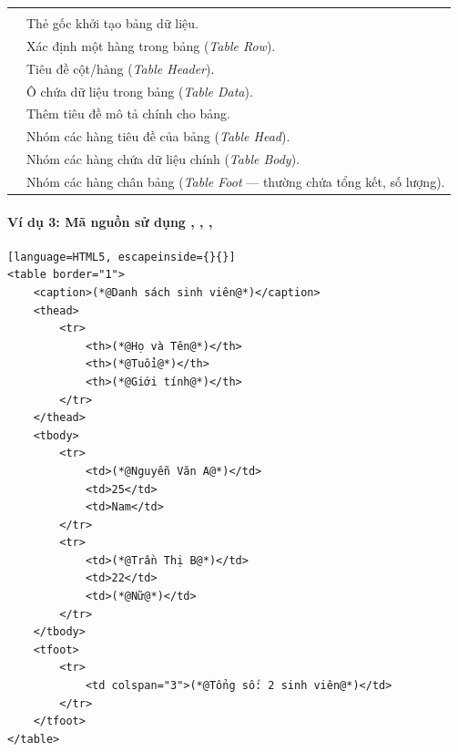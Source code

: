 \begin{prettyTableBox}
\begin{tabularx}{\linewidth}{K{2.5cm} Z}
 &  \\
 & Thẻ gốc khởi tạo bảng dữ liệu. \\
 & Xác định một hàng trong bảng (\textit{Table Row}). \\
 & Tiêu đề cột/hàng (\textit{Table Header}). \\
 & Ô chứa dữ liệu trong bảng (\textit{Table Data}). \\
 & Thêm tiêu đề mô tả chính cho bảng. \\
 & Nhóm các hàng tiêu đề của bảng (\textit{Table Head}). \\
 & Nhóm các hàng chứa dữ liệu chính (\textit{Table Body}). \\
 & Nhóm các hàng chân bảng (\textit{Table Foot} --- thường chứa tổng kết, số lượng). \\
\end{tabularx}
\end{prettyTableBox}

\paragraph{Ví dụ 3: Mã nguồn sử dụng , , , }
\begin{codeWindow}
\begin{lstlisting}[language=HTML5, escapeinside={}{}]
<table border="1">
    <caption>(*@Danh sách sinh viên@*)</caption>
    <thead>
        <tr>
            <th>(*@Họ và Tên@*)</th>
            <th>(*@Tuổi@*)</th>
            <th>(*@Giới tính@*)</th>
        </tr>
    </thead>
    <tbody>
        <tr>
            <td>(*@Nguyễn Văn A@*)</td>
            <td>25</td>
            <td>Nam</td>
        </tr>
        <tr>
            <td>(*@Trần Thị B@*)</td>
            <td>22</td>
            <td>(*@Nữ@*)</td>
        </tr>
    </tbody>
    <tfoot>
        <tr>
            <td colspan="3">(*@Tổng số: 2 sinh viên@*)</td>
        </tr>
    </tfoot>
</table>
\end{lstlisting}
\end{codeWindow}

